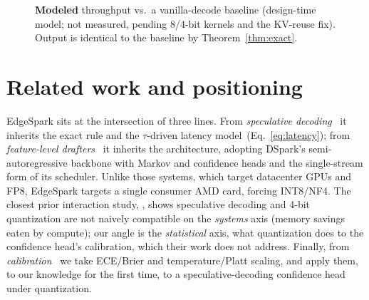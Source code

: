 \documentclass[11pt]{article}
\theoremstyle{plain}
\theoremstyle{definition}
\newcommand{\tokps}{tok/s}
\begin{document}
\begin{figure}[t]
\centering
{}
\caption{\textbf{Modeled} throughput vs.\ a vanilla-decode baseline (design-time
model; not measured, pending 8/4-bit kernels and the KV-reuse fix). Output is
identical to the baseline by Theorem~\ref{thm:exact}.}
\label{fig:throughput}
\end{figure}

\section{Related work and positioning}
EdgeSpark sits at the intersection of three lines. From \emph{speculative
decoding}~\citep{leviathan2023,chen2023} it inherits the exact rule and the
$\tau$-driven latency model~(Eq.~\ref{eq:latency}); from \emph{feature-level
drafters}~\citep{medusa2024,eagle2024,eagle2_2024,eagle3_2025,dspark2026} it
inherits the architecture, adopting DSpark's semi-autoregressive backbone with
Markov and confidence heads and the single-stream form of its scheduler. Unlike
those systems, which target datacenter GPUs and FP8, EdgeSpark targets a single
consumer AMD card, forcing INT8/NF4. The closest prior interaction study,
\citet{zhang2025}, shows speculative decoding and 4-bit quantization are not
naively compatible on the \emph{systems} axis (memory savings eaten by compute);
our angle is the \emph{statistical} axis, what quantization does to the confidence
head's calibration, which their work does not address. Finally, from
\emph{calibration}~\citep{guo2017,platt1999,brier1950} we take ECE/Brier and
temperature/Platt scaling, and apply them, to our knowledge for the first time, to
a speculative-decoding confidence head under quantization.
\end{document}
